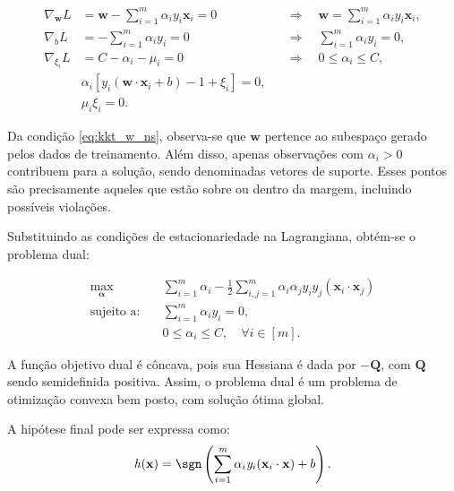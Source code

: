 \begin{align}
\nabla_{\mathbf{w}} L &= \mathbf{w} - \sum_{i=1}^{m} \alpha_i \mathit{y}_i \mathbf{x}_i = 0
&&\Longrightarrow\quad
\mathbf{w} = \sum_{i=1}^{m} \alpha_i \mathit{y}_i \mathbf{x}_i,
\label{eq:kkt_w_ns} \\[6pt]
\nabla_{b} L &= - \sum_{i=1}^{m} \alpha_i \mathit{y}_i = 0
&&\Longrightarrow\quad
\sum_{i=1}^{m} \alpha_i \mathit{y}_i = 0,
\label{eq:kkt_b_ns} \\[6pt]
\nabla_{\xi_i} L &= C - \alpha_i - \mu_i = 0
&&\Longrightarrow\quad
0 \leq \alpha_i \leq C,
\label{eq:kkt_xi_ns} \\[6pt]
&\alpha_i \left[\mathit{y}_i (\mathbf{w} \cdot \mathbf{x}_i + b) - 1 + \xi_i \right] = 0,
\label{eq:kkt_comp1_ns} \\[6pt]
&\mu_i \xi_i = 0.
\label{eq:kkt_comp2_ns}
\end{align}

Da condição \eqref{eq:kkt_w_ns}, observa-se que $\mathbf{w}$ pertence ao subespaço gerado
pelos dados de treinamento. Além disso, apenas observações com $\alpha_i > 0$ contribuem
para a solução, sendo denominadas vetores de suporte. Esses pontos são precisamente aqueles
que estão sobre ou dentro da margem, incluindo possíveis violações.

Substituindo as condições de estacionariedade na Lagrangiana, obtém-se o problema dual:

\begin{equation}
\begin{aligned}
\max_{\bm{\alpha}} \quad & \sum_{i=1}^{\mathit{m}} \alpha_i - \frac{1}{2} \sum_{i,j=1}^{\mathit{m}} \alpha_i \alpha_j \mathit{y}_i \mathit{y}_j \left(\mathbf{x}_i \cdot \mathbf{x}_j\right) \\
\text{sujeito a:} \quad & \sum_{i=1}^{\mathit{m}} \alpha_i \mathit{y}_i = 0, \\
& 0 \leq \alpha_i \leq C, \quad \forall i \in \left[\mathit{m}\right].
\end{aligned}
\end{equation}

A função objetivo dual é côncava, pois sua Hessiana é dada por $-\mathbf{Q}$, com
$\mathbf{Q}$ sendo semidefinida positiva. Assim, o problema dual é um problema de otimização
convexa bem posto, com solução ótima global.

A hipótese final pode ser expressa como:
\begin{equation}
\mathit{h}(\mathbf{x}) = \sgn \left( \sum_{i=1}^{\mathit{m}} \alpha_i \mathit{y}_i (\mathbf{x}_i \cdot \mathbf{x}) + b \right).
\end{equation}

